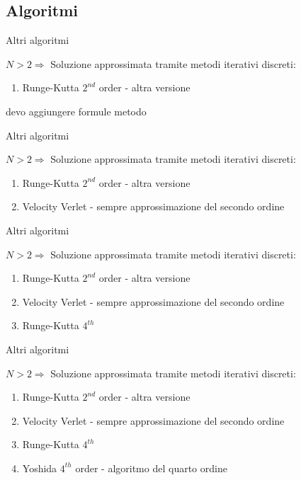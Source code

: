 \subsection[Algo II]{Algoritmi}
    \begin{frame}{Altri algoritmi}
        \begin{exampleblock}{$N>2 \Rightarrow$ Soluzione approssimata tramite metodi iterativi discreti:}
            \begin{enumerate}
                \item Runge-Kutta $2^{nd}$ order - altra versione
            \end{enumerate}
        \end{exampleblock}
        devo aggiungere formule metodo
    \end{frame}
    \begin{frame}{Altri algoritmi}
        \begin{exampleblock}{$N>2 \Rightarrow$ Soluzione approssimata tramite metodi iterativi discreti:}
            \begin{enumerate}
                \item Runge-Kutta $2^{nd}$ order - altra versione
                \item Velocity Verlet - sempre approssimazione del secondo ordine
            \end{enumerate}
        \end{exampleblock}
    \end{frame}
    \begin{frame}{Altri algoritmi}
        \begin{exampleblock}{$N>2 \Rightarrow$ Soluzione approssimata tramite metodi iterativi discreti:}
            \begin{enumerate}
                \item Runge-Kutta $2^{nd}$ order - altra versione
                \item Velocity Verlet - sempre approssimazione del secondo ordine
                \item Runge-Kutta $4^{th}$
            \end{enumerate}
        \end{exampleblock}
    \end{frame}
    \begin{frame}{Altri algoritmi}
        \begin{exampleblock}{$N>2 \Rightarrow$ Soluzione approssimata tramite metodi iterativi discreti:}
            \begin{enumerate}
                \item Runge-Kutta $2^{nd}$ order - altra versione
                \item Velocity Verlet - sempre approssimazione del secondo ordine
                \item Runge-Kutta $4^{th}$
                \item Yoshida $4^{th}$ order - algoritmo del quarto ordine
            \end{enumerate}
        \end{exampleblock}
    \end{frame}
